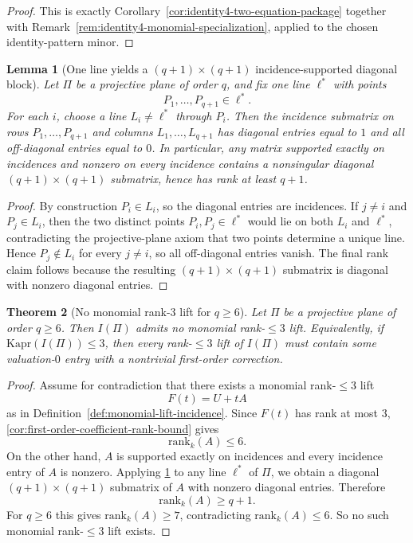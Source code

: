 \documentclass[11pt]{amsart}
\numberwithin{equation}{section}
\theoremstyle{plain}
\newtheorem{theorem}{Theorem}[section]
\newtheorem{lemma}[theorem]{Lemma}
\theoremstyle{definition}
\theoremstyle{remark}
\newcommand{\Kapr}{\mathrm{Kapr}}
\newcommand{\rank}{\mathrm{rank}}
\begin{document}
\begin{proof}
This is exactly Corollary~\ref{cor:identity4-two-equation-package} together with Remark~\ref{rem:identity4-monomial-specialization}, applied to the chosen identity-pattern minor.
\end{proof}

\begin{lemma}[One line yields a $(q+1)\times(q+1)$ incidence-supported diagonal block]
\label{lem:one-line-incidence-diagonal-block}
Let $\Pi$ be a projective plane of order $q$, and fix one line $\ell^*$ with points
\[
P_1,\dots,P_{q+1}\in \ell^*.
\]
For each $i$, choose a line $L_i\neq \ell^*$ through $P_i$.
Then the incidence submatrix on rows $P_1,\dots,P_{q+1}$ and columns $L_1,\dots,L_{q+1}$ has diagonal entries equal to $1$ and all off-diagonal entries equal to $0$.
In particular, any matrix supported exactly on incidences and nonzero on every incidence contains a nonsingular diagonal $(q+1)\times(q+1)$ submatrix, hence has rank at least $q+1$.
\end{lemma}

\begin{proof}
By construction $P_i\in L_i$, so the diagonal entries are incidences.
If $j\neq i$ and $P_j\in L_i$, then the two distinct points $P_i,P_j\in \ell^*$ would lie on both $L_i$ and $\ell^*$, contradicting the projective-plane axiom that two points determine a unique line.
Hence $P_j\notin L_i$ for every $j\neq i$, so all off-diagonal entries vanish.
The final rank claim follows because the resulting $(q+1)\times(q+1)$ submatrix is diagonal with nonzero diagonal entries.
\end{proof}

\begin{theorem}[No monomial rank-$3$ lift for $q\ge 6$]
\label{thm:no-monomial-rank3-lift}
Let $\Pi$ be a projective plane of order $q\ge 6$.
Then $I(\Pi)$ admits no monomial rank-$\le 3$ lift.
Equivalently, if $\Kapr(I(\Pi))\le 3$, then every rank-$\le 3$ lift of $I(\Pi)$ must contain some valuation-$0$ entry with a nontrivial first-order correction.
\end{theorem}

\begin{proof}
Assume for contradiction that there exists a monomial rank-$\le 3$ lift
\[
F(t)=U+tA
\]
as in Definition~\ref{def:monomial-lift-incidence}.
Since $F(t)$ has rank at most $3$, \cref{cor:first-order-coefficient-rank-bound} gives
\[
\rank_k(A)\le 6.
\]
On the other hand, $A$ is supported exactly on incidences and every incidence entry of $A$ is nonzero.
Applying \cref{lem:one-line-incidence-diagonal-block} to any line $\ell^*$ of $\Pi$, we obtain a diagonal $(q+1)\times(q+1)$ submatrix of $A$ with nonzero diagonal entries.
Therefore
\[
\rank_k(A)\ge q+1.
\]
For $q\ge 6$ this gives $\rank_k(A)\ge 7$, contradicting $\rank_k(A)\le 6$.
So no such monomial rank-$\le 3$ lift exists.
\end{proof}
\end{document}
